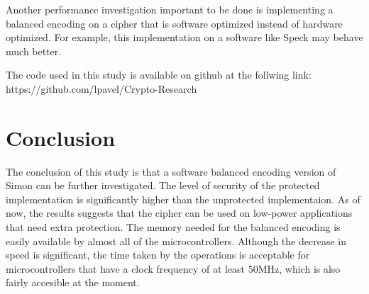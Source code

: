 \documentclass[conference]{IEEEtran}
\begin{document}
Another performance investigation important to be done is implementing a balanced encoding on a cipher that is software optimized instead of hardware optimized. For example, this implementation on a software like Speck may behave much better.

The code used in this study is available on github at the follwing link:\\
https://github.com/lpavel/Crypto-Research

\section{Conclusion}

The conclusion of this study is that a software balanced encoding version of Simon can be further investigated. The level of security of the protected implementation is significantly higher than the unprotected implementaion. As of now, the results suggests that the cipher can be used on low-power applications that need extra protection. The memory needed for the balanced encoding is easily available by almost all of the microcontrollers. Although the decrease in speed is significant, the time taken by the operations is acceptable for microcontrollers that have a clock frequency of at least 50MHz, which is also fairly accesible at the moment.




%


\end{document}
